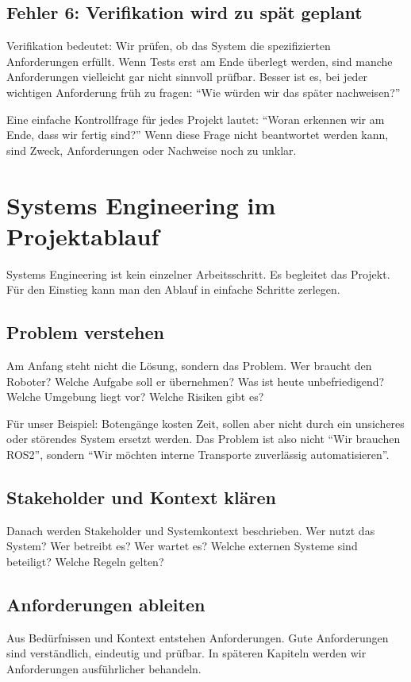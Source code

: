 \subsection{Fehler 6: Verifikation wird zu spät geplant}
Verifikation bedeutet: Wir prüfen, ob das System die spezifizierten Anforderungen erfüllt. Wenn Tests erst am Ende überlegt werden, sind manche Anforderungen vielleicht gar nicht sinnvoll prüfbar. Besser ist es, bei jeder wichtigen Anforderung früh zu fragen: \enquote{Wie würden wir das später nachweisen?}

\begin{hinweisbox}
Eine einfache Kontrollfrage für jedes Projekt lautet: \enquote{Woran erkennen wir am Ende, dass wir fertig sind?} Wenn diese Frage nicht beantwortet werden kann, sind Zweck, Anforderungen oder Nachweise noch zu unklar.
\end{hinweisbox}

\section{Systems Engineering im Projektablauf}
Systems Engineering ist kein einzelner Arbeitsschritt. Es begleitet das Projekt. Für den Einstieg kann man den Ablauf in einfache Schritte zerlegen.

\subsection{Problem verstehen}
Am Anfang steht nicht die Lösung, sondern das Problem. Wer braucht den Roboter? Welche Aufgabe soll er übernehmen? Was ist heute unbefriedigend? Welche Umgebung liegt vor? Welche Risiken gibt es?

Für unser Beispiel: Botengänge kosten Zeit, sollen aber nicht durch ein unsicheres oder störendes System ersetzt werden. Das Problem ist also nicht \enquote{Wir brauchen ROS2}, sondern \enquote{Wir möchten interne Transporte zuverlässig automatisieren}.

\subsection{Stakeholder und Kontext klären}
Danach werden Stakeholder und Systemkontext beschrieben. Wer nutzt das System? Wer betreibt es? Wer wartet es? Welche externen Systeme sind beteiligt? Welche Regeln gelten?

\subsection{Anforderungen ableiten}
Aus Bedürfnissen und Kontext entstehen Anforderungen. Gute Anforderungen sind verständlich, eindeutig und prüfbar. In späteren Kapiteln werden wir Anforderungen ausführlicher behandeln.

